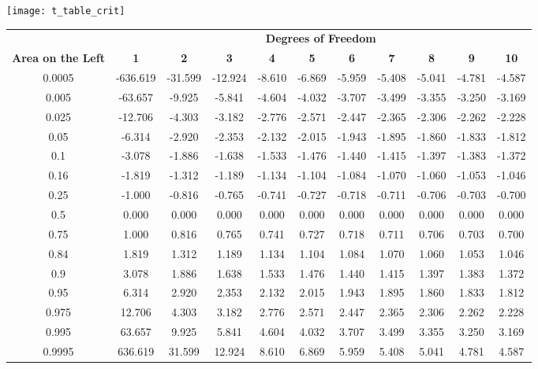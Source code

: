 
    \texttt{[image: t\_table\_crit]}
        
\begin{center}
\begin{tabular}{ccccccccccc}
 & \multicolumn{10}{c}{\bf Degrees of Freedom} \\
{\bf Area on the Left} & {\bf 1} & {\bf 2} & {\bf 3} & {\bf 4} & {\bf 5} & {\bf 6} & {\bf 7} & {\bf 8} & {\bf 9} & {\bf 10}\\
0.0005 & -636.619 & -31.599 & -12.924 & -8.610 & -6.869 & -5.959 & -5.408 & -5.041 & -4.781 & -4.587\\
0.005 & -63.657 & -9.925 & -5.841 & -4.604 & -4.032 & -3.707 & -3.499 & -3.355 & -3.250 & -3.169\\
0.025 & -12.706 & -4.303 & -3.182 & -2.776 & -2.571 & -2.447 & -2.365 & -2.306 & -2.262 & -2.228\\
0.05 & -6.314 & -2.920 & -2.353 & -2.132 & -2.015 & -1.943 & -1.895 & -1.860 & -1.833 & -1.812\\
0.1 & -3.078 & -1.886 & -1.638 & -1.533 & -1.476 & -1.440 & -1.415 & -1.397 & -1.383 & -1.372\\
0.16 & -1.819 & -1.312 & -1.189 & -1.134 & -1.104 & -1.084 & -1.070 & -1.060 & -1.053 & -1.046\\
0.25 & -1.000 & -0.816 & -0.765 & -0.741 & -0.727 & -0.718 & -0.711 & -0.706 & -0.703 & -0.700\\
0.5 & 0.000 & 0.000 & 0.000 & 0.000 & 0.000 & 0.000 & 0.000 & 0.000 & 0.000 & 0.000\\
0.75 & 1.000 & 0.816 & 0.765 & 0.741 & 0.727 & 0.718 & 0.711 & 0.706 & 0.703 & 0.700\\
0.84 & 1.819 & 1.312 & 1.189 & 1.134 & 1.104 & 1.084 & 1.070 & 1.060 & 1.053 & 1.046\\
0.9 & 3.078 & 1.886 & 1.638 & 1.533 & 1.476 & 1.440 & 1.415 & 1.397 & 1.383 & 1.372\\
0.95 & 6.314 & 2.920 & 2.353 & 2.132 & 2.015 & 1.943 & 1.895 & 1.860 & 1.833 & 1.812\\
0.975 & 12.706 & 4.303 & 3.182 & 2.776 & 2.571 & 2.447 & 2.365 & 2.306 & 2.262 & 2.228\\
0.995 & 63.657 & 9.925 & 5.841 & 4.604 & 4.032 & 3.707 & 3.499 & 3.355 & 3.250 & 3.169\\
0.9995 & 636.619 & 31.599 & 12.924 & 8.610 & 6.869 & 5.959 & 5.408 & 5.041 & 4.781 & 4.587\\
\end{tabular}
\end{center}

